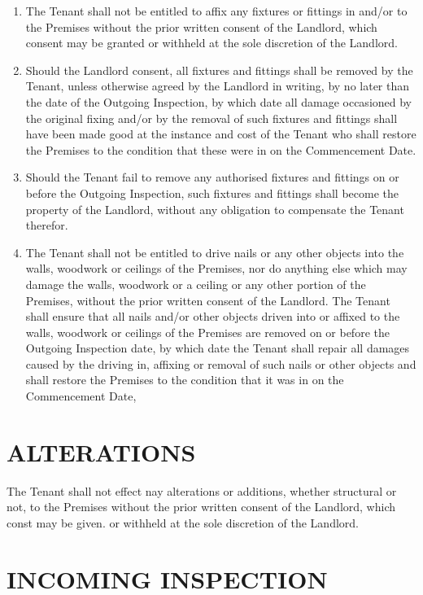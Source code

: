 \documentclass[11pt]{article}
\begin{document}
\begin{enumerate}
	\item The Tenant shall not be entitled to affix any fixtures or fittings in and/or to the Premises without the prior written consent of the Landlord, which consent may be granted or withheld at the sole discretion of the Landlord.
	\item Should the Landlord consent, all fixtures and fittings shall be removed by the Tenant, unless otherwise agreed by the Landlord in writing, by no later than the date of the Outgoing Inspection, by which date all damage occasioned by the original fixing and/or by the removal of such fixtures and fittings shall have been made good at the instance and cost of the Tenant who shall restore the Premises to the condition that these were in on the Commencement Date.
	\item Should the Tenant fail to remove any authorised fixtures and fittings on or before the Outgoing Inspection, such fixtures and fittings shall become the property of the Landlord, without any obligation to compensate the Tenant therefor.
	\item The Tenant shall not be entitled to drive nails or any other objects into the walls, woodwork or ceilings of the Premises, nor do anything else which may damage the walls, woodwork or a ceiling or any other portion of the Premises, without the prior written consent of the Landlord. The Tenant shall ensure that all nails and/or other objects driven into or affixed to the walls, woodwork or ceilings of the Premises are removed on or before the Outgoing Inspection date, by which date the Tenant shall repair all damages caused by the driving in, affixing or removal of such nails or other objects and shall restore the Premises to the condition that it was in on the Commencement Date,
\end{enumerate}

\section{\uppercase{alterations}}
\label{sec:alterations}

The Tenant shall not effect nay alterations or additions, whether structural or not, to the Premises without the prior written consent of the Landlord, which const may be given. or withheld at the sole discretion of the Landlord.

\section{\uppercase{incoming inspection}}
\label{sec:incoming-inspection}
\end{document}
